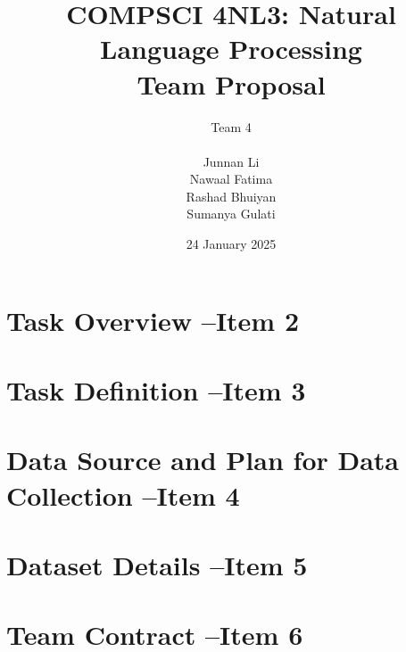 \documentclass[titlepage]{article}
\title{COMPSCI 4NL3: Natural Language Processing\\Team Proposal}
\author{Team 4\\
\\ Junnan Li
\\ Nawaal Fatima
\\ Rashad Bhuiyan
\\ Sumanya Gulati}
\date{24 January 2025}
\begin{document}
\begin{titlepage}
    \maketitle
\end{titlepage}

\newpage 

\tableofcontents
\listoftables
\listoffigures

\newpage


\section{Task Overview --Item 2}

\section{Task Definition --Item 3}

\section{Data Source and Plan for Data Collection --Item 4}

\section{Dataset Details --Item 5}

\section{Team Contract --Item 6}
\end{document}
